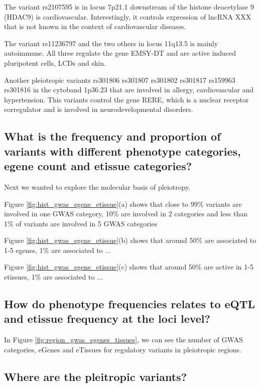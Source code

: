 The variant rs2107595 is in locus 7p21.1 downstream of the histone deacetylase 9 (HDAC9) is cardiovascular. Interestingly, it controls expression of lncRNA XXX that is not known in the context of cardiovascular diseases.

The variant rs11236797 and the two others in locus 11q13.5 is mainly autoimmune.
All three regulate the gene EMSY-DT and are active induced pluripotent cells, LCDs and skin.

Another pleiotropic variants rs301806
rs301807
rs301802
rs301817
rs159963
rs301816
in the cytoband 1p36.23 that are involved in allergy, cardiovascular and hypertension.
This variants control the gene RERE, which is a nuclear receptor corregulator and is involved in neurodevelopmental disorders.\\

\subsection*{What is the frequency and proportion of variants with different phenotype categories, egene count and etissue categories?}

Next we wanted to explore the molecular basis of pleiotropy.

Figure \ref{fig:hist_gwas_egene_etissue}(a) shows that close to 99\% variants are involved in one GWAS category, 10\% are involved in 2 categories and less than 1\% of variants are involved in 5 GWAS categories

Figure \ref{fig:hist_gwas_egene_etissue}(b) shows that around 50\% are associated to 1-5 egenes, 1\% are associated to ...

Figure \ref{fig:hist_gwas_egene_etissue}(c) shows that around 50\% are active in 1-5 etissues, 1\% are associated to ...

\subsection*{How do phenotype frequencies relates to eQTL and etissue frequency at the loci level?}

In Figure \ref{fig:region_gwas_egenes_tissues}, we can see the number of GWAS categories, eGenes and eTissues for regulatory variants in pleiotropic regions.

\subsection*{Where are the pleitropic variants?}

